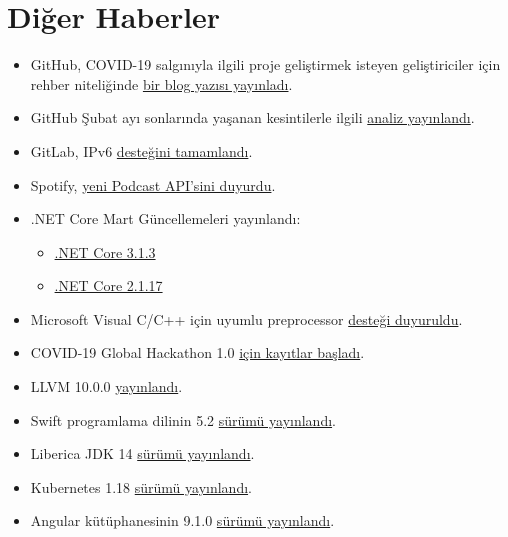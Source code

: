 \documentclass[11pt]{article}
\begin{document}
\section{Diğer Haberler}
\label{sec:orgbf9b730}
\begin{itemize}
\item GitHub, COVID-19 salgınıyla ilgili proje geliştirmek isteyen geliştiriciler
için rehber niteliğinde \href{https://github.blog/2020-03-23-open-collaboration-on-covid-19/}{bir blog yazısı yayınladı}.
\item GitHub Şubat ayı sonlarında yaşanan kesintilerle ilgili \href{https://github.blog/2020-03-26-february-service-disruptions-post-incident-analysis/}{analiz yayınlandı}.
\item GitLab, IPv6 \href{https://gitlab.com/gitlab-com/gl-infra/infrastructure/-/issues/645\#note\_313218618}{desteğini tamamlandı}.
\item Spotify, \href{https://developer.spotify.com/community/news/2020/03/20/introducing-podcasts-api/}{yeni Podcast API'sini duyurdu}.
\item .NET Core Mart Güncellemeleri yayınlandı:
\begin{itemize}
\item \href{https://github.com/dotnet/core/blob/master/release-notes/3.1/3.1.3/3.1.3.md}{.NET Core 3.1.3}
\item \href{https://github.com/dotnet/core/blob/master/release-notes/2.1/2.1.17/2.1.17.md}{.NET Core 2.1.17}
\end{itemize}
\item Microsoft Visual C/C++ için uyumlu preprocessor \href{https://devblogs.microsoft.com/cppblog/announcing-full-support-for-a-c-c-conformant-preprocessor-in-msvc/}{desteği duyuruldu}.
\item COVID-19 Global Hackathon 1.0 \href{https://covid-global-hackathon.devpost.com/}{için kayıtlar başladı}.
\item LLVM 10.0.0 \href{http://lists.llvm.org/pipermail/llvm-announce/2020-March/000087.html}{yayınlandı}.
\item Swift programlama dilinin 5.2 \href{https://swift.org/blog/swift-5-2-released/}{sürümü yayınlandı}.
\item Liberica JDK 14 \href{https://bell-sw.com/announcements/2020/03/18/Liberica-JDK-14/}{sürümü yayınlandı}.
\item Kubernetes 1.18 \href{https://kubernetes.io/blog/2020/03/25/kubernetes-1-18-release-announcement/}{sürümü yayınlandı}.
\item Angular kütüphanesinin 9.1.0 \href{https://github.com/angular/angular/releases/tag/9.1.0}{sürümü yayınlandı}.

\end{itemize}
\end{document}
